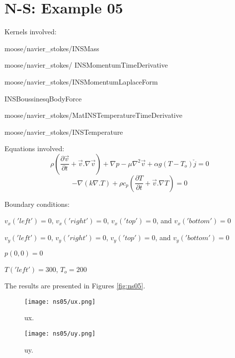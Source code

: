 \documentclass[11pt,letterpaper]{article}
\begin{document}
\section{N-S: Example 05}

Kernels involved:
\begin{description}[font=$\bullet$\scshape\bfseries]
	\item[] moose/navier\_stokes/INSMass
	\item[] moose/navier\_stokes/
	INSMomentumTimeDerivative
	\item[] moose/navier\_stokes/INSMomentumLaplaceForm
	\item[] INSBoussinesqBodyForce
	\item[] moose/navier\_stokes/MatINSTemperatureTimeDerivative
	\item[] moose/navier\_stokes/INSTemperature
\end{description}

Equations involved:
\begin{equation}
\rho (\frac{\partial \vec{v}}{\partial t}+\vec{v} . \nabla\vec{v})+\nabla p - \mu \nabla^{2}\vec{v} + \alpha g (T - T_{o})\check{j} = 0
\end{equation}
\begin{equation}
-\nabla(k \nabla . T)+\rho c_{p}(\frac{\partial T}{\partial t}+\vec{v} . \nabla T)=0
\end{equation}

Boundary conditions:
\begin{description}[]
	\item[] $v_{x}('left')=0$, $v_{x}('right')=0$, $v_{x}('top')=0$, and $v_{x}('bottom')=0$
	\item[] $v_{y}('left')=0$, $v_{y}('right')=0$, $v_{y}('top')=0$,
	and $v_{y}('bottom')=0$
	\item[] $p(0,0)=0$
	\item[] $T('left')=300$, $T_{o}=200$
\end{description}

The results are presented in Figures \ref{fig:ns05}.
\begin{figure*}[!h]
	\centering
	\begin{subfigure}[t]{0.4\textwidth}
		\centering
		\texttt{[image: ns05/ux.png]} 
		\caption{ux.}
		\label{fig:ns05-ux}
	\end{subfigure}
	\vspace{1cm}
	\begin{subfigure}[t]{0.4\textwidth}
		\centering
		\texttt{[image: ns05/uy.png]}
		\caption{uy.}
		\label{fig:ns05-uy}
	\end{subfigure}
	\hfill
	\caption{Temperature.}
	\label{fig:ns05}
\end{figure*}
\end{document}
